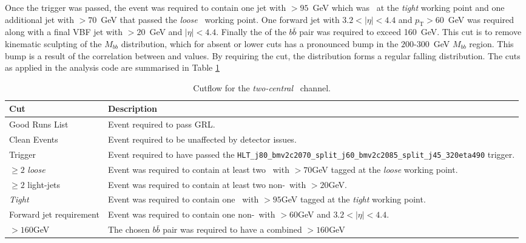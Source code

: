 		Once the trigger was passed, the event was required to contain one jet with \pt$>95$~GeV which was \btagged\, at the \textit{tight} working point and one additional jet with \pt$>70$~GeV that passed the \textit{loose} \btag\, working point. One forward jet with $3.2 < |\eta| < 4.4$ and $p_{\text{T}}>60$~GeV was required along with a final VBF jet with \pt$>20$~GeV and $|\eta| < 4.4$. Finally the \pt of the $b\bar{b}$ pair was required to exceed 160~GeV. This cut is to remove kinematic sculpting of the $M_{bb}$ distribution, which for absent or lower \ptbb cuts has a pronounced bump in the $200$-$300$~GeV $M_{bb}$ region. This bump is a result of the correlation between \mbb and \ptbb values. By requiring the \ptbb cut, the \mbb distribution forms a regular falling distribution. The cuts as applied in the analysis code are summarised in Table \ref{tab:cuts}

		\begin{table}[h]
		\caption[\textit{Two-central} channel event cuts]{Cutflow for the \textit{two-central} \VBFHBB\ channel.}
		\label{tab:cuts}
		\medskip
		\centering
		\begin{tabularx}{\textwidth}{p{2.5cm} X}\toprule
			Cut & Description \\\midrule
			Good Runs List & Event required to pass GRL.\\
			Clean Events & Event required to be unaffected by detector issues.\\
			Trigger & Event required to have passed the \texttt{HLT\_j80\_bmv2c2070\_split\_\-j60\_bmv2c2085\_split\_j45\_320eta490} trigger.\\
			$\geq2$ \textit{loose} & Event was required to contain at least two \bjets\ with \pt$>70$GeV tagged at the \textit{loose} working point.\\
			$\geq2$ light-jets & Event was required to contain at least two non-\bjets\ with \pt$>20$GeV.\\
			\textit{Tight} \bjet & Event was required to contain one \bjet\ with \pt$>95$GeV tagged at the \textit{tight} working point.\\
			Forward jet requirement & Event was required to contain one non-\bjet\ with \pt$>60$GeV and $3.2 < |\eta| < 4.4$.\\
			\ptbb$>160$GeV & The chosen $b\bar{b}$ pair was required to have a combined \pt$>160$GeV \\
			\bottomrule
		\end{tabularx}
	\end{table}

